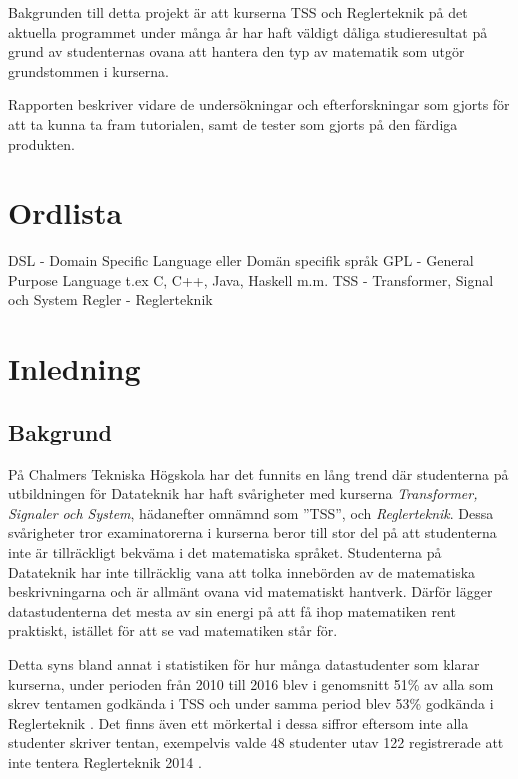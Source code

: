 \documentclass[]{article}
\begin{document}
Bakgrunden till detta projekt är att kurserna TSS och Reglerteknik på det aktuella programmet under många år har haft väldigt dåliga studieresultat på grund av studenternas ovana att hantera den typ av matematik som utgör grundstommen i kurserna.

Rapporten beskriver vidare de undersökningar och efterforskningar som gjorts för att ta kunna ta fram tutorialen, samt de tester som gjorts på den färdiga produkten.

\section{Ordlista}
DSL - Domain Specific Language eller Domän specifik språk
GPL - General Purpose Language t.ex C, C++, Java, Haskell m.m.
TSS - Transformer, Signal och System
Regler - Reglerteknik

\section{Inledning}

\subsection{Bakgrund}

%

På Chalmers Tekniska Högskola har det funnits en lång trend där
studenterna på utbildningen för Datateknik har haft svårigheter
med kurserna \textit{Transformer, Signaler och System}, hädanefter omnämnd
som ''TSS'', och \textit{Reglerteknik}.
Dessa svårigheter tror examinatorerna i kurserna beror till stor del på att
studenterna inte är tillräckligt bekväma i det matematiska språket.
Studenterna på Datateknik har inte tillräcklig vana att tolka innebörden av de matematiska beskrivningarna och är allmänt ovana vid matematiskt hantverk.
Därför lägger datastudenterna det mesta av sin energi på att få ihop matematiken
rent praktiskt, istället för att se vad matematiken står för.

Detta syns bland annat i statistiken för hur många datastudenter som
klarar kurserna, under perioden från 2010 till 2016 blev i genomsnitt 51\% av
alla som skrev tentamen godkända i TSS och under samma period blev 53\% godkända
i Reglerteknik \cite{tentastatistik}. Det finns även ett mörkertal i dessa siffror
eftersom inte alla studenter skriver tentan, exempelvis valde 48 studenter utav 122
registrerade att inte tentera Reglerteknik 2014 \cite{kursinformation:ere102:14-15}.
\end{document}
